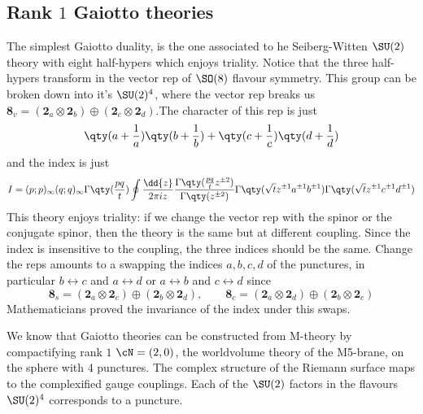 \subsection{Rank $1$ Gaiotto theories}
The simplest Gaiotto duality, is the one associated to he Seiberg-Witten $\SU(2)$ theory with eight half-hypers which enjoys triality. Notice that the three half-hypers transform in the vector rep of $\SO(8)$ flavour symmetry. This group can be broken down into it's $\SU(2)^{4}$, where the vector rep breaks us $\mathbf{8}_{v}=(\mathbf{2}_{a}\otimes\mathbf{2}_{b})\oplus(\mathbf{2}_{c}\otimes\mathbf{2}_{d})$.The character of this rep is just
\begin{equation}
	\qty(a+\frac{1}{a})\qty(b+\frac{1}{b})+\qty(c+\frac{1}{c})\qty(d+\frac{1}{d})
\end{equation}
and the index is just
\begin{equation}
	I=(p;p)_{\infty}(q;q)_{\infty}\Gamma\qty(\frac{pq}{t})\oint\frac{\dd{z}}{2\pi i z}\frac{\Gamma\qty(\frac{pq}{t}z^{\pm2})}{\Gamma\qty(z^{\pm2})}\Gamma\qty(\sqrt{t}z^{\pm 1}a^{\pm 1}b^{\pm 1})\Gamma\qty(\sqrt{t}z^{\pm 1}c^{\pm 1}d^{\pm 1})
\end{equation}
This theory enjoys triality: if we change the vector rep with the spinor or the conjugate spinor, then the theory is the same but at different coupling. Since the index is insensitive to the coupling, the three indices should be the same. Change the reps amounts to a swapping the indices $a,b,c,d$ of the punctures, in particular $b\leftrightarrow c$ and $a\leftrightarrow d$ or $a\leftrightarrow b$ and $c\leftrightarrow d$ since
\begin{equation}
	\mathbf{8}_{s}=(\mathbf{2}_{a}\otimes\mathbf{2}_{c})\oplus(\mathbf{2}_{b}\otimes\mathbf{2}_{d}),\qquad \mathbf{8}_{c}=(\mathbf{2}_{a}\otimes\mathbf{2}_{d})\oplus(\mathbf{2}_{b}\otimes\mathbf{2}_{c})
\end{equation} 
Mathematicians proved the invariance of the index under this swaps.

We know that Gaiotto theories can be constructed from M-theory by compactifying rank $1$ $\cN=(2,0)$, the worldvolume theory of the M5-brane, on the sphere with $4$ punctures. The complex structure of the Riemann surface maps to the complexified gauge couplings. Each of the $\SU(2)$ factors in the flavours $\SU(2)^{4}$ corresponds to a puncture.\\

